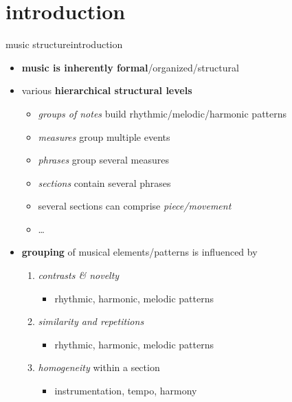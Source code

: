     \section[intro]{introduction}
        \begin{frame}{music structure}{introduction}
            \begin{itemize}
                \item   \textbf{music is inherently formal}/organized/structural
                \smallskip
                \item<1->   various \textbf{hierarchical structural levels}
                    \begin{itemize}
                        \item   \textit{groups of notes} build rhythmic/melodic/harmonic patterns
                        \item   \textit{measures} group multiple events
                        \item   \textit{phrases} group several measures
                        \item   \textit{sections} contain several phrases
                        \item   several sections can comprise \textit{piece/movement}
                        \item   \ldots
                    \end{itemize}
                \smallskip
                \item<2->    \textbf{grouping} of musical elements/patterns is influenced by
                    \begin{enumerate}
                        \item   \textit{contrasts \& novelty}
                            \begin{itemize}
                                \item   rhythmic, harmonic, melodic patterns
                            \end{itemize}
                        \item   \textit{similarity and repetitions}
                            \begin{itemize}
                                \item   rhythmic, harmonic, melodic patterns
                            \end{itemize}
                        \item   \textit{homogeneity} within a section 
                            \begin{itemize}
                                \item   instrumentation, tempo, harmony
                            \end{itemize}
                    \end{enumerate}
            \end{itemize}
        \end{frame}
